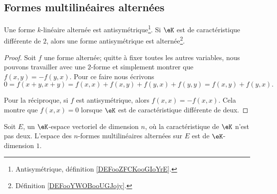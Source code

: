 \subsection{Formes multilinéaires alternées}

\begin{lemma}   \label{LemHiHNey}
	Une forme \( k\)-linéaire alternée est antisymétrique\footnote{Antisymétrique, définition \ref{DEFooZFCKooGIoYrE}.}. Si \( \eK\) est de caractéristique différente de \( 2\), alors une forme antisymétrique est alternée\footnote{Définition \ref{DEFooYWOBooUGJojy}.}.
\end{lemma}

\begin{proof}
	Soit \( f\) une forme alternée; quitte à fixer toutes les autres variables, nous pouvons travailler avec une \( 2\)-forme et simplement montrer que \( f(x,y)=-f(y,x)\). Pour ce faire nous écrivons
	\begin{equation}
		0=f(x+y,x+y)=f(x,x)+f(x,y)+f(y,x)+f(y,y)=f(x,y)+f(y,x).
	\end{equation}

	Pour la réciproque, si \( f\) est antisymétrique, alors \( f(x,x)=-f(x,x)\). Cela montre que \( f(x,x)=0\) lorsque \( \eK\) est de caractéristique différente de deux.
\end{proof}

\begin{proposition} \label{ProprbjihK}
	Soit \( E\), un \( \eK\)-espace vectoriel de dimension \( n\), où la caractéristique de \( \eK\) n'est pas deux. L'espace des \( n\)-formes multilinéaires alternées sur \( E\) est de \( \eK\)-dimension \( 1\).
\end{proposition}

